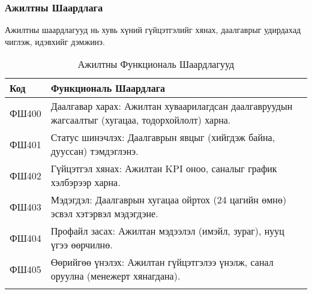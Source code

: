 \documentclass[a4paper]{report} %
\begin{document}
\subsubsection{Ажилтны Шаардлага}
Ажилтны шаардлагууд нь хувь хүний гүйцэтгэлийг хянах, даалгаврыг удирдахад чиглэж, идэвхийг дэмжинэ.

\begin{longtable}{|p{2cm}|p{8.5cm}|}
\hline
\textbf{Код} & \textbf{Функциональ Шаардлага} \\ \hline
\endhead
ФШ400 & Даалгавар харах: Ажилтан хуваарилагдсан даалгавруудын жагсаалтыг (хугацаа, тодорхойлолт) харна. \\ \hline
ФШ401 & Статус шинэчлэх: Даалгаврын явцыг (хийгдэж байна, дууссан) тэмдэглэнэ. \\ \hline
ФШ402 & Гүйцэтгэл хянах: Ажилтан KPI оноо, саналыг график хэлбэрээр харна. \\ \hline
ФШ403 & Мэдэгдэл: Даалгаврын хугацаа ойртох (24 цагийн өмнө) эсвэл хэтэрвэл мэдэгдэне. \\ \hline
ФШ404 & Профайл засах: Ажилтан мэдээлэл (имэйл, зураг), нууц үгээ өөрчилнө. \\ \hline
ФШ405 & Өөрийгөө үнэлэх: Ажилтан гүйцэтгэлээ үнэлж, санал оруулна (менежерт хянагдана). \\ \hline
\caption{Ажилтны Функциональ Шаардлагууд} \label{tab:employee_requirements}
\end{longtable}
\end{document}
